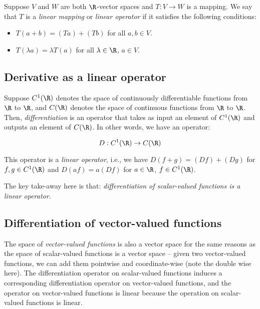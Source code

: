 Suppose $V$ and $W$ are both $\R$-vector spaces and $T:V \to W$ is a
mapping. We say that $T$ is a {\em linear mapping} or {\em linear
operator} if it satisfies the following conditions:

\begin{itemize}
\item $T(a + b) = (Ta) + (Tb)$ for all $a,b \in V$.
\item $T(\lambda a) = \lambda T(a)$ for all $\lambda \in \R$, $a \in V$.
\end{itemize}

\subsection{Derivative as a linear operator}

Suppose $C^1(\R)$ denotes the space of continuously differentiable
functions from $\R$ to $\R$, and $C(\R)$ denotes the space of
continuous functions from $\R$ to $\R$. Then, {\em differentiation} is
an operator that takes as input an element of $C^1(\R)$ and outputs an
element of $C(\R)$. In other words, we have an operator:

$$D:C^1(\R) \to C(\R)$$

This operator is a {\em linear operator}, i.e., we have $D(f + g) =
(Df) + (Dg)$ for $f,g \in C^1(\R)$ and $D(af) = a(Df)$ for $a \in \R$,
$f \in C^1(\R)$.

The key take-away here is that: {\em differentiation of scalar-valued
functions is a linear operator}.

\subsection{Differentiation of vector-valued functions}

The space of {\em vector-valued functions} is also a vector space for
the same reasons as the space of scalar-valued functions is a vector
space -- given two vector-valued functions, we can add them pointwise
and coordinate-wise (note the double wise here). The differentiation
operator on scalar-valued functions induces a corresponding
differentiation operator on vector-valued functions, and the operator
on vector-valued functions is linear because the operation on
scalar-valued functions is linear.

